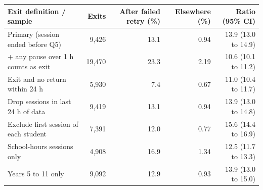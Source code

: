 \begin{tabular}{lrrrr}
\toprule
Exit definition / sample & Exits & After failed retry (\%) & Elsewhere (\%) & Ratio (95\% CI) \\
\midrule
Primary (session ended before Q5) & 9{,}426 & 13.1 & 0.94 & 13.9 (13.0 to 14.9) \\
+ any pause over 1 h counts as exit & 19{,}470 & 23.3 & 2.19 & 10.6 (10.1 to 11.2) \\
Exit and no return within 24 h & 5{,}930 & 7.4 & 0.67 & 11.0 (10.4 to 11.7) \\
Drop sessions in last 24 h of data & 9{,}419 & 13.1 & 0.94 & 13.9 (13.0 to 14.8) \\
Exclude first session of each student & 7{,}391 & 12.0 & 0.77 & 15.6 (14.4 to 16.9) \\
School-hours sessions only & 4{,}908 & 16.9 & 1.34 & 12.5 (11.7 to 13.3) \\
Years 5 to 11 only & 9{,}092 & 12.9 & 0.93 & 13.9 (13.0 to 15.0) \\
\bottomrule
\end{tabular}
